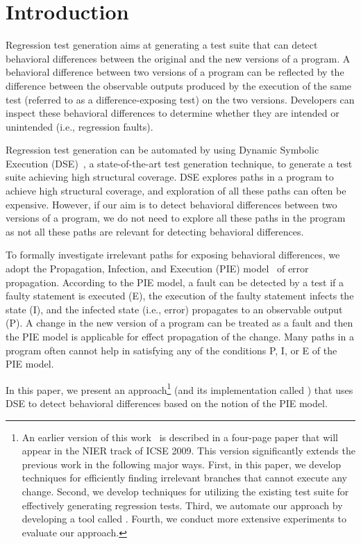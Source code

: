 
\section{Introduction}
\label{sec:intro}
Regression test generation aims at generating a test suite that can detect behavioral differences between the original and the new versions of a program. A behavioral difference between two versions of a program can be reflected by the difference between the observable outputs produced by the execution of the same test (referred to as a difference-exposing test) on the two versions. Developers can inspect these behavioral differences to determine whether they are intended or unintended (i.e., regression faults).

Regression test generation can be automated by using Dynamic Symbolic
Execution (DSE)~\cite{dart, cute, exe}, a state-of-the-art test generation
technique, to generate a test suite achieving high
structural coverage. DSE explores paths in a program to
achieve high structural coverage, and exploration of all
these paths can often be expensive. However, if our aim is
to detect behavioral differences between two versions of a
program, we do not need to explore all these paths in the program
as not all these paths are relevant for detecting behavioral
differences.

To formally investigate irrelevant paths for exposing behavioral differences, we adopt the 
Propagation, Infection, and Execution (PIE) model~\cite{voas} of error propagation. According to the PIE model, a fault can be detected by a test if a faulty statement is executed (E), the execution of the faulty statement infects the state (I), and the infected state (i.e., error) propagates to an observable output (P). A change in the new version of a program can be treated as a fault and then the PIE model is applicable for effect propagation of the change. Many paths in a program often cannot help in satisfying any of the conditions P, I, or E of the PIE model. 

In this paper, we present an approach\footnote{An earlier version of this work~\cite{taneja09:guided} is described in a four-page paper that will appear in the NIER track of ICSE 2009. This
version significantly extends the previous work in the following major ways.
First, in this paper, we develop techniques for efficiently finding irrelevant branches 
that cannot execute any change. 
Second, we develop techniques for utilizing the existing test suite for effectively generating regression tests.
Third, we automate our approach by developing a tool called . 
Fourth, we conduct more extensive experiments to evaluate our approach.} (and its implementation called ) that uses DSE to detect behavioral differences based on the notion of the PIE model.

